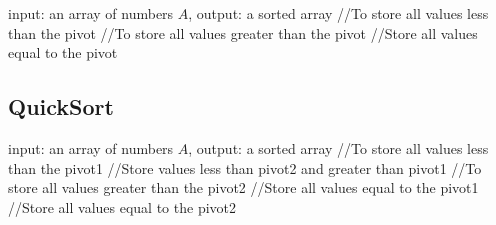 \documentclass{article}
\begin{document}
\begin{algorithm}[h!]
    \begin{algorithmic}[1]
         { input:  an array of numbers $A$, output: a sorted array}
              //To store all values less than the pivot
              //To store all values greater than the pivot
                //Store all values equal to the pivot
                \Else{}
                \EndIf
            \EndFor{}  
            \State{} 
 
        \EndFunction{}
    \end{algorithmic}
\end{algorithm}



\subsection{QuickSort}
\begin{algorithm}[h!]
    \begin{algorithmic}[1]
         {input:  an array of numbers $A$, output: a sorted array}
              //To store all values less than the pivot1
              //Store values less than pivot2 and greater than pivot1
              //To store all values greater than the pivot2
                //Store all values equal to the pivot1
                //Store all values equal to the pivot2
                \Else{}
                \EndIf
            \EndFor{}  
            \State{} 
 
        \EndFunction{}
    \end{algorithmic}
\end{algorithm}
\end{document}

